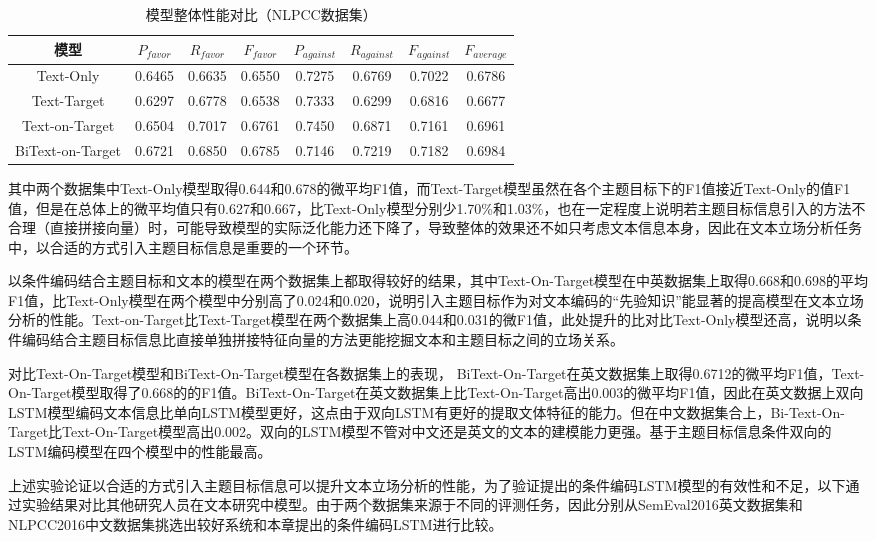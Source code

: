 \begin{table}[htbp]
	\caption[table123]{模型整体性能对比（NLPCC数据集）}
	\label{semeval_all_model}
	\vspace{0.5em}\centering\wuhao
	\begin{tabular}{cccccccc}
		\toprule[1.5pt]
		模型& $P_{favor}$&$R_{favor}$&$F_{favor}$&$P_{against}$&$R_{against}$&$F_{against}$&$F_{average}$ \\
		\midrule[1pt]
		Text-Only&0.6465&0.6635&0.6550&0.7275&0.6769&0.7022&0.6786\\
		Text-Target&0.6297&0.6778&0.6538&0.7333&0.6299&0.6816&0.6677\\
		Text-on-Target&0.6504&0.7017&0.6761&0.7450&0.6871&0.7161&0.6961\\
		BiText-on-Target&0.6721&0.6850&0.6785&0.7146&0.7219&0.7182&0.6984\\
		\bottomrule[1.5pt]
	\end{tabular}
\end{table}

其中两个数据集中Text-Only模型取得0.644和0.678的微平均F1值，而Text-Target模型虽然在各个主题目标下的F1值接近Text-Only的值F1值，但是在总体上的微平均值只有0.627和0.667，比Text-Only模型分别少1.70\%和1.03\%，也在一定程度上说明若主题目标信息引入的方法不合理（直接拼接向量）时，可能导致模型的实际泛化能力还下降了，导致整体的效果还不如只考虑文本信息本身，因此在文本立场分析任务中，以合适的方式引入主题目标信息是重要的一个环节。

以条件编码结合主题目标和文本的模型在两个数据集上都取得较好的结果，其中Text-On-Target模型在中英数据集上取得0.668和0.698的平均F1值，比Text-Only模型在两个模型中分别高了0.024和0.020，说明引入主题目标作为对文本编码的“先验知识”能显著的提高模型在文本立场分析的性能。Text-on-Target比Text-Target模型在两个数据集上高0.044和0.031的微F1值，此处提升的比对比Text-Only模型还高，说明以条件编码结合主题目标信息比直接单独拼接特征向量的方法更能挖掘文本和主题目标之间的立场关系。

对比Text-On-Target模型和BiText-On-Target模型在各数据集上的表现， BiText-On-Target在英文数据集上取得0.6712的微平均F1值，Text-On-Target模型取得了0.668的的F1值。BiText-On-Target在英文数据集上比Text-On-Target高出0.003的微平均F1值，因此在英文数据上双向LSTM模型编码文本信息比单向LSTM模型更好，这点由于双向LSTM有更好的提取文体特征的能力。但在中文数据集合上，Bi-Text-On-Target比Text-On-Target模型高出0.002。双向的LSTM模型不管对中文还是英文的文本的建模能力更强。基于主题目标信息条件双向的LSTM编码模型在四个模型中的性能最高。

上述实验论证以合适的方式引入主题目标信息可以提升文本立场分析的性能，为了验证提出的条件编码LSTM模型的有效性和不足，以下通过实验结果对比其他研究人员在文本研究中模型。由于两个数据集来源于不同的评测任务，因此分别从SemEval2016英文数据集和NLPCC2016中文数据集挑选出较好系统和本章提出的条件编码LSTM进行比较。

